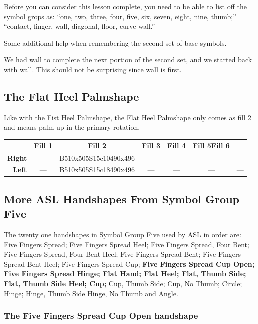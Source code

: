 \documentclass{article}
\begin{document}
Before you can consider this lesson complete, you need to be able to list off the symbol grops as:
``one, two, three, four, five, six, seven, eight, nine, thumb;''
``contact, finger, wall, diagonal, floor, curve wall.''

Some additional help when remembering the second set of base symbols.

We had wall to complete the next portion of the second set, and we started back with wall.
This should not be surprising since wall is first.

\subsection{The Flat Heel Palmshape}

Like with the Fist Heel Palmshape, the Flat Heel Palmshape only comes as fill 2 and means palm up in the primary rotation.

\begin{center}
\begin{tabular}{r*{6}{c}}
&\textbf{Fill 1}&\textbf{Fill 2}&\textbf{Fill 3}&\textbf{Fill 4}&\textbf{Fill 5}\textbf{Fill 6}\\
\textbf{Right}&---&B510x505S15c10490x496&---&---&---&---\\
\textbf{Left} &---&B510x505S15c18490x496&---&---&---&---\\
\end{tabular}
\end{center}

\subsection{More ASL Handshapes From Symbol Group Five}

The twenty one handshapes in Symbol Group Five used by ASL in order are:
Five Fingers Spread;
Five Fingers Spread Heel;
Five Fingers Spread, Four Bent;
Five Fingers Spread, Four Bent Heel;
Five Fingers Spread Bent;
Five Fingers Spread Bent Heel;
Five Fingers Spread Cup;
{\bf
Five Fingers Spread Cup Open;
Five Fingers Spread Hinge;
Flat Hand;
Flat Heel;
Flat, Thumb Side;
Flat, Thumb Side Heel;
Cup;
}
Cup, Thumb Side;
Cup, No Thumb;
Circle;
Hinge;
Hinge, Thumb Side
Hinge, No Thumb
and Angle.

\subsubsection{The Five Fingers Spread Cup Open handshape}
\end{document}
